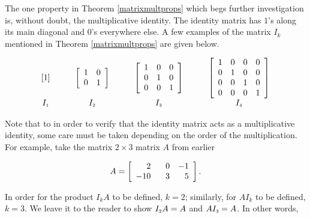 \smallskip

The one property in Theorem \ref{matrixmultprops} which begs further investigation is, without doubt, the multiplicative identity. The identity matrix has $1$'s along its main diagonal and $0$'s everywhere else.  A few examples of the matrix $I_{k}$ mentioned in Theorem \ref{matrixmultprops} are given below.  

\[ \begin{array}{ccccc}

[1]&  \qquad \left[ \begin{array}{rr} 1 & 0 \\ 0 & 1 \\ \end{array} \right] &  \qquad  \left[ \begin{array}{rrr} 1 & 0 & 0 \\ 0 & 1 & 0 \\ 0 & 0 & 1 \\ \end{array} \right] &  \qquad \left[ \begin{array}{rrrr} 1 & 0 & 0 & 0 \\ 0 & 1 & 0 & 0 \\ 0 & 0 & 1 & 0 \\  0 & 0 & 0 & 1 \\  \end{array} \right] \\
I_{\mbox{\tiny$1$}} &  \qquad  I_{\mbox{\tiny$2$}} &  \qquad I_{\mbox{\tiny$3$}} & \qquad  I_{\mbox{\tiny$4$}} \\

\end{array} \]

Note that to in order to verify that the identity matrix acts as a multiplicative identity, some care must be taken depending on the order of the multiplication.  For example, take the matrix $2 \times 3$ matrix $A$ from earlier

\[A = \left[\begin{array}{rrr} 2 & \hphantom{-}0 & -1 \\ -10 & 3 & 5 \\ \end{array} \right].\]

In order for the product $I_{k}A$ to be defined, $k = 2$;  similarly, for $AI_{k}$ to be defined, $k = 3$.  We leave it to the reader to show $I_{\mbox{\tiny$2$}}A = A$ and $AI_{\mbox{\tiny$3$}} = A$.  In other words,



